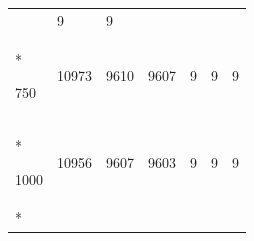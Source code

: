 \documentclass[
  12pt,
  oneside,
  openany]{book}
\begin{document}
\begin{appendices}
\begin{singlespace}
\begin{longtable}[]{@{}lllllll@{}}
\begin{minipage}[t]{0.17\columnwidth}
\end{minipage} & \begin{minipage}[t]{0.14\columnwidth}\raggedright
9\strut
\end{minipage} & \begin{minipage}[t]{0.12\columnwidth}\raggedright
9\strut
\end{minipage}\tabularnewline*
\begin{minipage}[t]{0.15\columnwidth}\raggedright
750\strut
\end{minipage} & \begin{minipage}[t]{0.08\columnwidth}\raggedright
10973\strut
\end{minipage} & \begin{minipage}[t]{0.07\columnwidth}\raggedright
9610\strut
\end{minipage} & \begin{minipage}[t]{0.08\columnwidth}\raggedright
9607\strut
\end{minipage} & \begin{minipage}[t]{0.17\columnwidth}\raggedright
9\strut
\end{minipage} & \begin{minipage}[t]{0.14\columnwidth}\raggedright
9\strut
\end{minipage} & \begin{minipage}[t]{0.12\columnwidth}\raggedright
9\strut
\end{minipage}\tabularnewline*
\begin{minipage}[t]{0.15\columnwidth}\raggedright
1000\strut
\end{minipage} & \begin{minipage}[t]{0.08\columnwidth}\raggedright
10956\strut
\end{minipage} & \begin{minipage}[t]{0.07\columnwidth}\raggedright
9607\strut
\end{minipage} & \begin{minipage}[t]{0.08\columnwidth}\raggedright
9603\strut
\end{minipage} & \begin{minipage}[t]{0.17\columnwidth}\raggedright
9\strut
\end{minipage} & \begin{minipage}[t]{0.14\columnwidth}\raggedright
9\strut
\end{minipage} & \begin{minipage}[t]{0.12\columnwidth}\raggedright
9\strut
\end{minipage}\tabularnewline*

\end{longtable}
\end{singlespace}
\end{appendices}
\end{document}
